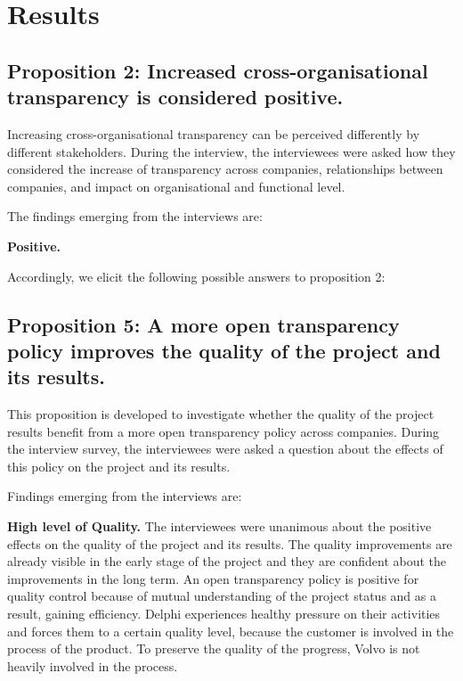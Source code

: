 \section{Results}\label{sec:results}



\subsection{Proposition 2: Increased cross-organisational transparency is considered positive.}

Increasing cross-organisational transparency can be perceived differently by different stakeholders. During the interview, the interviewees were asked how they considered the increase of transparency across companies, relationships between companies, and impact on organisational and functional level.

The findings emerging from the interviews are:

{\bf Positive.}

Accordingly, we elicit the following possible answers to proposition 2:


\subsection{Proposition 5: A more open transparency policy improves the quality of the project and its results.}

This proposition is developed to investigate whether the quality of the project results benefit from a more open transparency policy across companies. During the interview survey, the interviewees were asked a question about the effects of this policy on the project and its results. 

Findings emerging from the interviews are:

{\bf High level of Quality.} The interviewees were unanimous about the positive effects on the quality of the project and its results. The quality improvements are already visible in the early stage of the project and they are confident about the improvements in the long term. An open transparency policy is positive for quality control because of mutual understanding of the project status and as a result, gaining efficiency. Delphi experiences healthy pressure on their activities and forces them to a certain quality level, because the customer is involved in the process of the product. To preserve the quality of the progress, Volvo is not heavily involved in the process.


